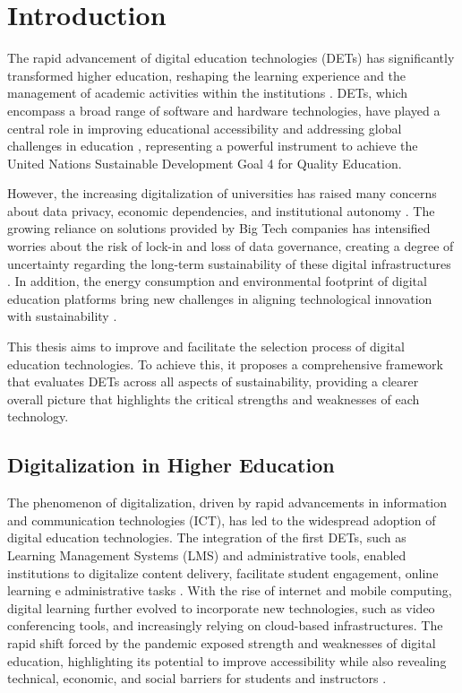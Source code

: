 \chapter{Introduction}
\label{cha:1_intro}
The rapid advancement of digital education technologies (DETs) has significantly transformed higher education, reshaping the learning experience and the management of academic activities within the institutions \cite{haleem_understanding_2022}\cite{lacka_examining_2021}. DETs, which encompass a broad range of software and hardware technologies, have played a central role in improving educational accessibility and addressing global challenges in education \cite{schuetze_digitalization_2024}, representing a powerful instrument to achieve the United Nations Sustainable Development Goal 4 for Quality Education.

However, the increasing digitalization of universities has raised many concerns about data privacy, economic dependencies, and institutional autonomy \cite{fiebig_heads_2023}\cite{komljenovic_rise_2021}. The growing reliance on solutions provided by Big Tech companies has intensified worries about the risk of lock-in and loss of data governance, creating a degree of uncertainty regarding the long-term sustainability of these digital infrastructures \cite{angeli_conceptualising_2022}. In addition, the energy consumption and environmental footprint of digital education platforms bring new challenges in aligning technological innovation with sustainability \cite{lago_framing_2015}.

This thesis aims to improve and facilitate the selection process of digital education technologies. To achieve this, it proposes a comprehensive framework that evaluates DETs across all aspects of sustainability, providing a clearer overall picture that highlights the critical strengths and weaknesses of each technology.

\section{Digitalization in Higher Education}
The phenomenon of digitalization, driven by rapid advancements in information and communication technologies (ICT), has led to the widespread adoption of digital education technologies. The integration of the first DETs, such as Learning Management Systems (LMS) and administrative tools, enabled institutions to digitalize content delivery, facilitate student engagement, online learning e administrative tasks \cite{lacka_examining_2021}. With the rise of internet and mobile computing, digital learning further evolved to incorporate new technologies, such as video conferencing tools, and increasingly relying on cloud-based infrastructures. The rapid shift forced by the pandemic exposed strength and weaknesses of digital education, highlighting its potential to improve accessibility while also revealing technical, economic, and social barriers for students and instructors \cite{schuetze_digitalization_2024}.

